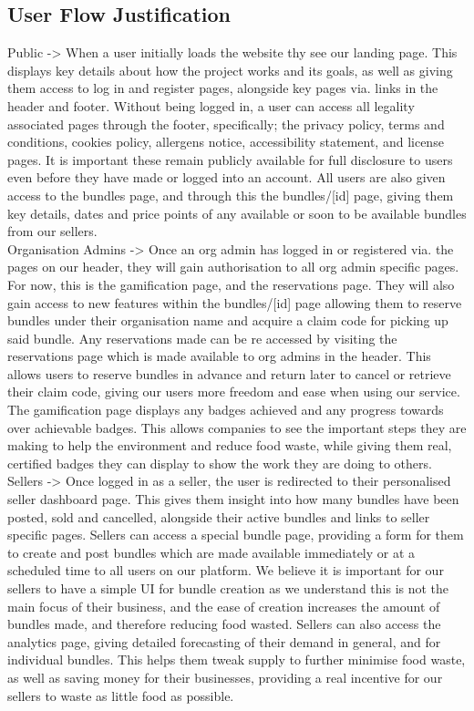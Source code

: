 \documentclass[11pt, a4paper]{report}
\begin{document}
\subsection{User Flow Justification}
Public -> When a user initially loads the website thy see our landing page. This displays key details about how the project works and its goals, as well as giving them access to log in and register pages, alongside key pages via. links in the header and footer. Without being logged in, a user can access all legality associated pages through the footer, specifically; the privacy policy, terms and conditions, cookies policy, allergens notice, accessibility statement, and license pages. It is important these remain publicly available for full disclosure to users even before they have made or logged into an account. All users are also given access to the bundles page, and through this the bundles/[id] page, giving them key details, dates and price points of any available or soon to be available bundles from our sellers.\\
Organisation Admins -> Once an org admin has logged in or registered via. the pages on our header, they will gain authorisation to all org admin specific pages. For now, this is the gamification page, and the reservations page. They will also gain access to new features within the bundles/[id] page allowing them to reserve bundles under their organisation name and acquire a claim code for picking up said bundle.
Any reservations made can be re accessed by visiting the reservations page which is made available to org admins in the header. This allows users to reserve bundles in advance and return later to cancel or retrieve their claim code, giving our users more freedom and ease when using our service. The gamification page displays any badges achieved and any progress towards over achievable badges. This allows companies to see the important steps they are making to help the environment and reduce food waste, while giving them real, certified badges they can display to show the work they are doing to others.\\
Sellers -> Once logged in as a seller, the user is redirected to their personalised seller dashboard page. This gives them insight into how many bundles have been posted, sold and cancelled, alongside their active bundles and links to seller specific pages. Sellers can access a special bundle page, providing a form for them to create and post bundles which are made available immediately or at a scheduled time to all users on our platform. We believe it is important for our sellers to have a simple UI for bundle creation as we understand this is not the main focus of their business, and the ease of creation increases the amount of bundles made, and therefore reducing food wasted. Sellers can also access the analytics page, giving detailed forecasting of their demand in general, and for individual bundles. This helps them tweak supply to further minimise food waste, as well as saving money for their businesses, providing a real incentive for our sellers to waste as little food as possible.
\end{document}
